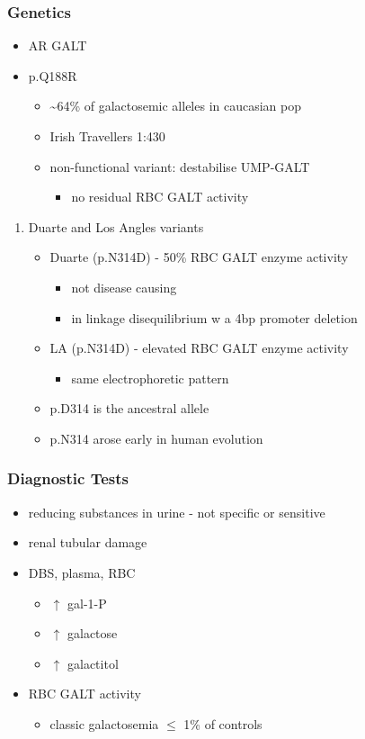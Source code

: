 \documentclass[12pt]{scrartcl}
\begin{document}
\subsubsection{Genetics}
\label{sec:org3d41b90}
\begin{itemize}
\item AR GALT
\item p.Q188R
\begin{itemize}
\item \textasciitilde{}64\% of galactosemic alleles in caucasian pop
\item Irish Travellers 1:430
\item non-functional variant: destabilise UMP-GALT
\begin{itemize}
\item no residual RBC GALT activity
\end{itemize}
\end{itemize}
\end{itemize}
\begin{enumerate}
\item Duarte and Los Angles variants
\label{sec:orga16ccf2}
\begin{itemize}
\item Duarte (p.N314D) - 50\% RBC GALT enzyme activity
\begin{itemize}
\item not disease causing
\item in linkage disequilibrium w a 4bp promoter deletion
\end{itemize}
\item LA (p.N314D) - elevated RBC GALT enzyme activity
\begin{itemize}
\item same electrophoretic pattern
\end{itemize}
\item p.D314 is the ancestral allele
\item p.N314 arose early in human evolution
\end{itemize}
\end{enumerate}

\subsubsection{Diagnostic Tests}
\label{sec:orge851fb9}
\begin{itemize}
\item reducing substances in urine - not specific or sensitive
\item renal tubular damage
\item DBS, plasma, RBC
\begin{itemize}
\item \(\uparrow\) gal-1-P
\item \(\uparrow\) galactose
\item \(\uparrow\) galactitol
\end{itemize}
\item RBC GALT activity
\begin{itemize}
\item classic galactosemia \(\le\) 1\% of controls
\end{itemize}
\end{itemize}
\end{document}
